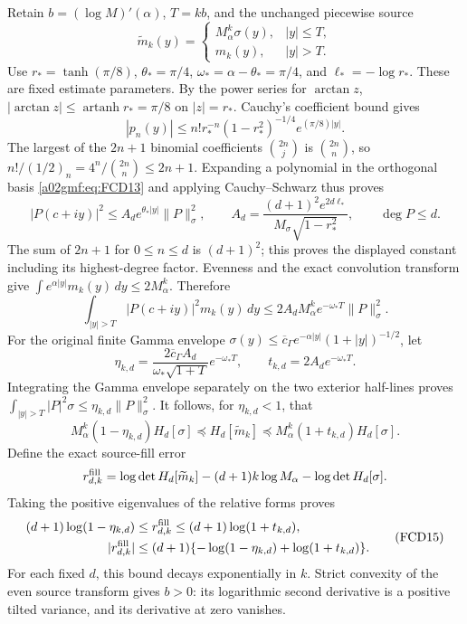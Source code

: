 Retain \(b=(\log M)'(\alpha)\), \(T=kb\), and the unchanged
piecewise source
\[
 \widetilde m_k(y)=
 \begin{cases}M_\alpha^k\sigma(y),&|y|\le T,\\
 m_k(y),&|y|>T.
 \end{cases}
\]
Use \(r_*=\tanh(\pi/8)\), \(\theta_*=\pi/4\),
\(\omega_*=\alpha-\theta_*=\pi/4\), and
\(\ell_*=-\log r_*\). These are fixed estimate parameters.
By the power series for \(\arctan z\),
\(|\arctan z|\le\operatorname{artanh}r_*=\pi/8\) on \(|z|=r_*\).
Cauchy's coefficient bound gives
\[
 |p_n(y)|\le n!r_*^{-n}(1-r_*^2)^{-1/4}
                                    e^{(\pi/8)|y|}.
\]
The largest of the \(2n+1\) binomial coefficients
\(\binom{2n}{j}\) is \(\binom{2n}{n}\), so
\(n!/(1/2)_n=4^n/\binom{2n}{n}\le2n+1\).
Expanding a polynomial in the orthogonal basis \eqref{a02gmf:eq:FCD13}
and applying Cauchy--Schwarz thus proves
\[
 |P(c+iy)|^2\le A_d e^{\theta_*|y|}\|P\|_\sigma^2,\qquad
 A_d=\frac{(d+1)^2e^{2d\ell_*}}
             {M_\sigma\sqrt{1-r_*^2}},
       \qquad \deg P\le d .
\]
The sum of \(2n+1\) for \(0\le n\le d\) is \((d+1)^2\);
this proves the displayed constant including its highest-degree factor.
Evenness and the exact convolution transform give
\(\int e^{\alpha|y|}m_k(y)\,dy\le2M_\alpha^k\).
Therefore
\[
 \int_{|y|>T}|P(c+iy)|^2m_k(y)\,dy
  \le2A_dM_\alpha^ke^{-\omega_*T}\|P\|_\sigma^2 .
\]
For the original finite Gamma envelope
\(\sigma(y)\le\overline c_\Gamma
e^{-\alpha|y|}(1+|y|)^{-1/2}\), let
\[
 \eta_{k,d}=\frac{2\overline c_\Gamma A_d}
                 {\omega_*\sqrt{1+T}}e^{-\omega_*T},
 \qquad t_{k,d}=2A_de^{-\omega_*T}.
\]
Integrating the Gamma envelope separately on the two exterior half-lines
proves
\(\int_{|y|>T}|P|^2\sigma\le\eta_{k,d}\|P\|_\sigma^2\).
It follows, for \(\eta_{k,d}<1\), that
\[
 M_\alpha^k(1-\eta_{k,d})H_d[\sigma]
  \preceq H_d[\widetilde m_k]
  \preceq M_\alpha^k(1+t_{k,d})H_d[\sigma].
\]
Define the exact source-fill error
\[
 r_{d,k}^{\rm fill}
   =\log\det H_d[\widetilde m_k]
        -(d+1)k\log M_\alpha-\log\det H_d[\sigma].
\]
Taking the positive eigenvalues of the relative forms proves
\begin{equation}
 \begin{split}
 (d+1)\log(1-\eta_{k,d})
       &\le r_{d,k}^{\rm fill}
                 \le(d+1)\log(1+t_{k,d}),\\
 |r_{d,k}^{\rm fill}|
       &\le(d+1)\{-\log(1-\eta_{k,d})+\log(1+t_{k,d})\}.
 \end{split}
 \tag{FCD15}\label{a02gmf:eq:FCD15}
\end{equation}
For each fixed \(d\), this bound decays exponentially in \(k\).
Strict convexity of the even source transform gives \(b>0\):
its logarithmic second derivative is a positive tilted variance, and
its derivative at zero vanishes.

